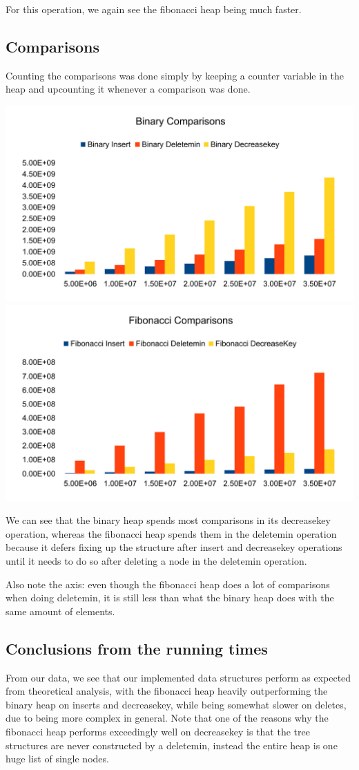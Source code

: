 For this operation, we again see the fibonacci heap being much faster.

\subsection{Comparisons}
Counting the comparisons was done simply by keeping a counter variable in the heap and upcounting it whenever a comparison was done.

\includegraphics[width=\textwidth]{graphs/bin_comp.pdf}
\includegraphics[width=\textwidth]{graphs/fib_comp.pdf}

We can see that the binary heap spends most comparisons in its decreasekey operation, whereas the fibonacci heap spends them in the deletemin operation because it defers fixing up the structure after insert and decreasekey operations until it needs to do so after deleting a node in the deletemin operation.

Also note the axis: even though the fibonacci heap does a lot of comparisons when doing deletemin, it is still less than what the binary heap does with the same amount of elements.

\subsection{Conclusions from the running times}
From our data, we see that our implemented data structures perform as expected from theoretical analysis, with the fibonacci heap heavily outperforming the  binary heap on inserts and decreasekey, while being somewhat slower on deletes, due to being more complex in  general.
Note that one of the reasons why the fibonacci heap performs exceedingly well on decreasekey is that the tree structures are never constructed by a deletemin, instead the entire heap is one huge list of single nodes. 


